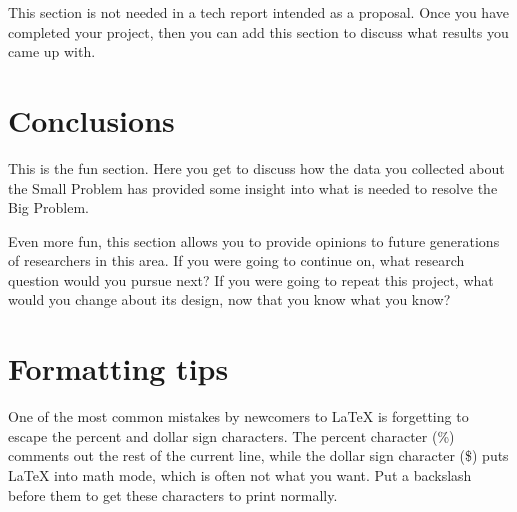 \documentclass[english]{proposalnsf}
\begin{document}
This section is not needed in a tech report intended as a proposal.  Once you have completed your project, then you can add this section to discuss what results you came up with.

\section{Conclusions}
\label{conclusions}

This is the fun section. Here you get to discuss how the data you collected about the Small Problem has provided some insight into what is needed to resolve the Big Problem.

Even more fun, this section allows you to provide opinions to future generations of researchers in this area. If you were going to continue on, what research question would you pursue next?  If you were going to repeat this project, what would you change about its design, now that you know what you know?





\appendix
\section{Formatting tips}

One of the most common mistakes by newcomers to LaTeX is forgetting to escape the percent and dollar sign characters. The percent character (\%) comments out the rest of the current line, while the dollar sign character (\$) puts LaTeX into math mode, which is often not what you want. Put a backslash before them to get these characters to print normally.
\end{document}
